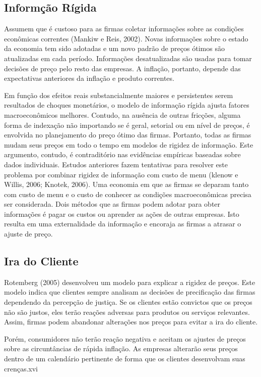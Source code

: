 \documentclass[twoside,a4paper,11pt]{report}
\begin{document}
\subsection*{Informção Rígida}

Assumem que é custoso para as firmas coletar informações sobre as condições econômicas correntes (Mankiw e Reis, 2002). Novas informações sobre o estado da economia tem sido adotadas e um novo padrão de preços ótimos são atualizadas em cada período. Informações desatualizadas são usadas para tomar decisões de preço pelo resto das empresas. A inflação, portanto, depende das expectativas anteriores da inflação e produto correntes.

Em função dos efeitos reais substancialmente maiores e persistentes serem resultados de choques monetários, o modelo de informação rígida ajusta fatores macroeconômicos melhores. Contudo, na ausência de outras fricções, alguma forma de indexação não importando se é geral, setorial ou em nível de preços, é envolvida no planejamento do preço ótimo das firmas. Portanto, todas as firmas mudam seus preços em todo o tempo em modelos de rigidez de informação. Este argumento, contudo, é contraditório nas evidências empíricas baseadas sobre dados individuais. Estudos anteriores fazem tentativas para resolver este problema por combinar rigidez de informação com custo de menu (klenow e Willis, 2006; Knotek, 2006). Uma economia em que as firmas se deparam tanto com custo de menu e o custo de conhecer as condições macroeconômicas precisa ser considerada. Dois métodos que as firmas podem adotar para obter informações é pagar os custos ou aprender as ações de outras empresas. Isto resulta em uma externalidade da informação e encoraja as firmas a atrasar o ajuste de preço.

\subsection*{Ira do Cliente}

Rotemberg (2005) desenvolveu um modelo para explicar a rigidez de preços. Este modelo indica que clientes sempre analisam as decisões de precificação das firmas dependendo da percepção de justiça. Se os clientes estão convictos que os preços não são justos, eles terão reações adversas para produtos ou serviços relevantes. Assim, firmas podem abandonar alterações nos preços para evitar a ira do cliente. 

Porém, consumidores não terão reação negativa e aceitam os ajustes de preços sobre as circuntâncias de rápida inflação. As empresas alterarão seus preços dentro de um calendário pertinente de forma que os clientes desenvolvam suas crenças.xvi 
\end{document}
